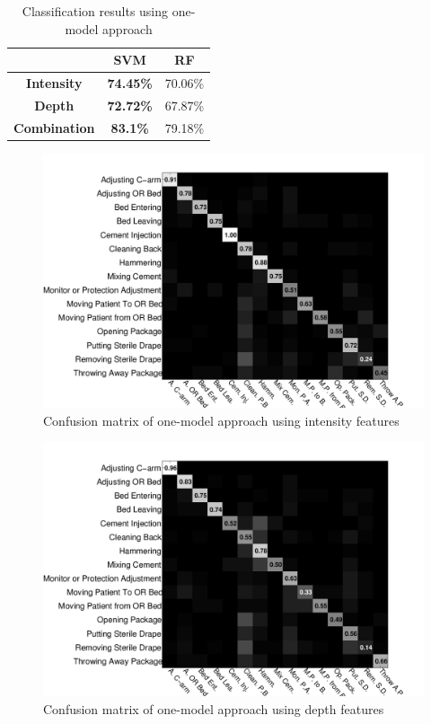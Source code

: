 \begin{table}[h]
\centering
\begin{tabular}{|c|c|c|}
\hline
                     & \textbf{SVM}     & \textbf{RF} \\ \hline
\textbf{Intensity}   & \textbf{74.45\%} & 70.06\%     \\ \hline
\textbf{Depth}       & \textbf{72.72\%} & 67.87\%     \\ \hline
\textbf{Combination} & \textbf{83.1\%}  & 79.18\%     \\ \hline
\end{tabular}
\caption{Classification results using one-model approach}
\label{table:oneModelResults}
\end{table}

\begin{figure}[H]
\begin{center}
\includegraphics[scale=0.4]{Figures/intensity-onemodel}
\end{center}
\caption{Confusion matrix of one-model approach using intensity features \label{fig:intensityOneModelConfusionMatrix}}
\end{figure}
        
\begin{figure}[H]
\begin{center}
\includegraphics[scale=0.4]{Figures/depth-onemodel}
\end{center}
\caption{Confusion matrix of one-model approach using depth features \label{fig:depthOneModelConfusionMatrix}}
\end{figure}

